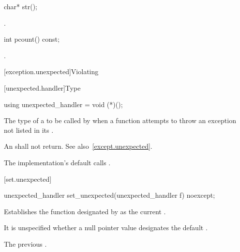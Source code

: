 %
\begin{itemdecl}
char* str();
\end{itemdecl}

\begin{itemdescr}
\pnum
\returns
{}.
\end{itemdescr}

%
\begin{itemdecl}
int pcount() const;
\end{itemdecl}

\begin{itemdescr}
\pnum
\returns
{}.
\end{itemdescr}

[exception.unexpected]{Violating }

[unexpected.handler]{Type }

%
\begin{itemdecl}
using unexpected_handler = void (*)();
\end{itemdecl}

\begin{itemdescr}
\pnum
The type of a
to be called by
when a function attempts to throw an exception not listed in its
.

\pnum
\required
An
shall not return.
See also~\ref{except.unexpected}.

\pnum
{}
The implementation's default  calls
.
\end{itemdescr}

[set.unexpected]{}

%
\begin{itemdecl}
unexpected_handler set_unexpected(unexpected_handler f) noexcept;
\end{itemdecl}

\begin{itemdescr}
\pnum
\effects
Establishes the function designated by  as the current
.

\pnum
\remark It is unspecified whether a null pointer value designates the default
.

\pnum
\returns
The previous .
\end{itemdescr}

